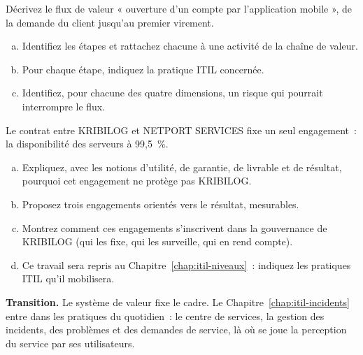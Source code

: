 \begin{boxexo}[title={\ding{45}\quad Exercice~12.2. Un flux de valeur à la BANQUE SANAGA \niveaumoyen}]
Décrivez le flux de valeur « ouverture d'un compte par l'application
mobile », de la demande du client jusqu'au premier virement.
\begin{enumerate}[(a)]
    \item Identifiez les étapes et rattachez chacune à une activité de la
          chaîne de valeur.
    \item Pour chaque étape, indiquez la pratique ITIL concernée.
    \item Identifiez, pour chacune des quatre dimensions, un risque qui
          pourrait interrompre le flux.
\end{enumerate}
\end{boxexo}

\begin{boxexo}[title={\ding{45}\quad Exercice~12.3. Le contrat de KRIBILOG au prisme d'ITIL~4 \niveauexpert}]
Le contrat entre KRIBILOG et NETPORT SERVICES fixe un seul engagement~: la
disponibilité des serveurs à 99,5~\%.
\begin{enumerate}[(a)]
    \item Expliquez, avec les notions d'utilité, de garantie, de livrable et
          de résultat, pourquoi cet engagement ne protège pas KRIBILOG.
    \item Proposez trois engagements orientés vers le résultat, mesurables.
    \item Montrez comment ces engagements s'inscrivent dans la gouvernance
          de KRIBILOG (qui les fixe, qui les surveille, qui en rend compte).
    \item Ce travail sera repris au Chapitre~\ref{chap:itil-niveaux}~:
          indiquez les pratiques ITIL qu'il mobilisera.
\end{enumerate}
\end{boxexo}

\bigskip

\begin{boxinfo}
\textbf{Transition.} Le système de valeur fixe le cadre. Le
Chapitre~\ref{chap:itil-incidents} entre dans les pratiques du quotidien~:
le centre de services, la gestion des incidents, des problèmes et des
demandes de service, là où se joue la perception du service par ses
utilisateurs.
\end{boxinfo}
